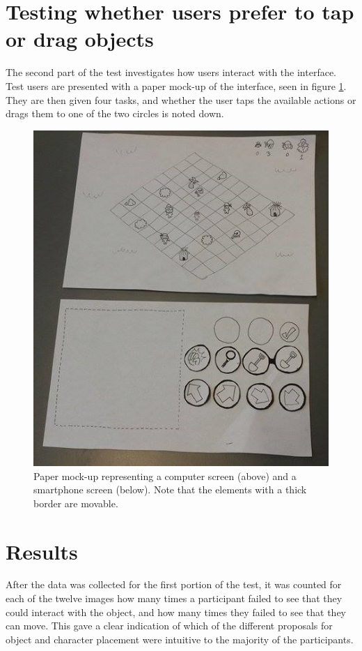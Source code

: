 \section{Testing whether users prefer to tap or drag objects}
The second part of the test investigates how users interact with the interface. Test users are presented with a paper mock-up of the interface, seen in figure \ref{fig:mockup}. They are then given four tasks, and whether the user taps the available actions or drags them to one of the two circles is noted down.

\begin{figure}[h!]
	\centering
	\includegraphics[scale=0.7]{figures/paper_1.jpg}
	\caption{Paper mock-up representing a computer screen (above) and a smartphone screen (below). Note that the elements with a thick border are movable. \label{fig:mockup}}
\end{figure}

\section{Results}
After the data was collected for the first portion of the test, it was counted for each of the twelve images how many times a participant failed to see that they could interact with the object, and how many times they failed to see that they can move. This gave a clear indication of which of the different proposals for object and character placement were intuitive to the majority of the participants.

